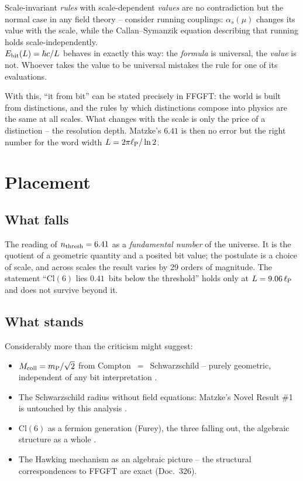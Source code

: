 \begin{tcolorbox}[proofbox, title={The actual finding}]
  Scale-invariant \emph{rules} with scale-dependent \emph{values} are no
  contradiction but the normal case in any field theory -- consider
  running couplings: $\alpha_s(\mu)$ changes its value with the scale,
  while the Callan--Symanzik equation describing that running holds
  scale-independently.\\[4pt]
  $E_{\mathrm{bit}}(L) = \hbar c/L$ behaves in exactly this way: the \emph{formula}
  is universal, the \emph{value} is not. Whoever takes the value to be
  universal mistakes the rule for one of its evaluations.
\end{tcolorbox}

With this, \enquote{it from bit} can be stated precisely in FFGFT:
the world is built from distinctions, and the rules by which distinctions
compose into physics are the same at all scales. What changes with the
scale is only the price of a distinction -- the resolution depth.
Matzke's $6.41$ is then no error but the right number for the word width
$L = 2\pi\ell_{\mathrm{P}}/\ln 2$.

\section{Placement}

\subsection{What falls}

The reading of $n_{\mathrm{thresh}} = 6.41$ as a \emph{fundamental number} of the
universe. It is the quotient of a geometric quantity and a posited bit
value; the postulate is a choice of scale, and across scales the result
varies by 29 orders of magnitude. The statement
\enquote{$\mathrm{Cl}(6)$ lies $0.41$~bits below the threshold} holds
only at $L = 9.06\,\ell_{\mathrm{P}}$ and does not survive beyond it. \X

\subsection{What stands}

Considerably more than the criticism might suggest:

\begin{itemize}
  \item $M_{\mathrm{coll}} = m_{\mathrm{P}}/\sqrt{2}$ from Compton~$=$~Schwarzschild -- purely
    geometric, independent of any bit interpretation \B.
  \item The Schwarzschild radius without field equations: Matzke's
    Novel Result \#1 is untouched by this analysis \B.
  \item $\mathrm{Cl}(6)$ as a fermion generation (Furey), the three
    falling out, the algebraic structure as a whole \B.
  \item The Hawking mechanism as an algebraic picture -- the structural
    correspondences to FFGFT are exact (Doc.~326).
\end{itemize}

